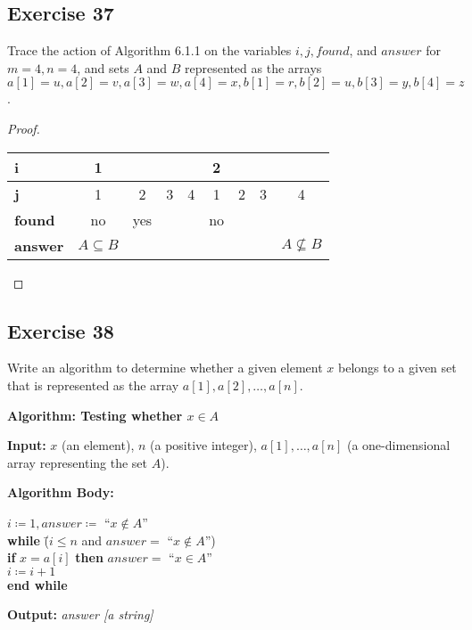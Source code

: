 \documentclass[14pt]{extarticle}
\newcommand{\cy}{\color{cyan}}
\begin{document}
\subsection{Exercise 37}
Trace the action of Algorithm 6.1.1 on the variables $i, j, found$, and $answer$ for $m = 4, n = 4$, and sets $A$ and
$B$ represented as the arrays \(a[1] = u, a[2] = v, a[3] = w, a[4] = x, b[1] = r, b[2] = u, b[3] = y, b[4] = z\).

\begin{proof}
  \begin{center}
    \begin{tabular}{|l|c|c|c|c|c|c|c|c|}
      \hline
      {\bf i}      & 1                 &     &   &   & 2  &   &   &                    \\
      \hline
      {\bf j}      & 1                 & 2   & 3 & 4 & 1  & 2 & 3 & 4                  \\
      \hline
      {\bf found}  & no                & yes &   &   & no &   &   &                    \\
      \hline
      {\bf answer} & \(A \subseteq B\) &     &   &   &    &   &   & \(A \nsubseteq B\) \\
      \hline
    \end{tabular}
  \end{center}
\end{proof}

\subsection{Exercise 38}
Write an algorithm to determine whether a given element $x$ belongs to a given set that is represented as the array
\(a[1], a[2], \ldots, a[n]\).

\begin{tcolorbox}[colframe=cyan]
  {\bf \cy Algorithm: Testing whether $x \in A$}

  {\bf \cy Input:} $x$ (an element), $n$ (a positive integer), \(a[1], \ldots, a[n]\) (a one-dimensional array
  representing the set $A$).

    {\bf \cy Algorithm Body:}
  \begin{tabbing}
    \(i \coloneqq 1, answer \coloneqq\) ``\(x \notin A\)'' \\
    {\bf while} \= (\(i \leq n\) and \(answer =\) ``\(x \notin A\)'') \\
    \> {\bf if} \(x = a[i]\) {\bf then} \(answer = \) ``\(x \in A\)'' \\
    \> \(i \coloneqq i + 1\) \\
    {\bf end while}
  \end{tabbing}
  {\bf \cy Output:} {\it answer [a string]}
\end{tcolorbox}
\end{document}
